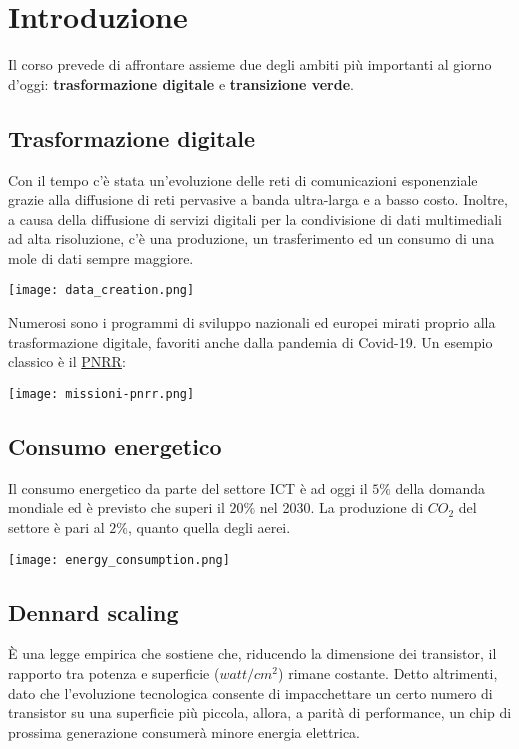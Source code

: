 \newpage
\section{Introduzione}
Il corso prevede di affrontare assieme due degli ambiti più importanti al giorno d'oggi: \textbf{trasformazione digitale} e \textbf{transizione verde}.
\subsection{Trasformazione digitale}
Con il tempo c'è stata un'evoluzione delle reti di comunicazioni esponenziale grazie alla diffusione di reti pervasive a banda ultra-larga e a basso costo. Inoltre, a causa della diffusione di servizi digitali per la condivisione di dati multimediali ad alta risoluzione, c'è una produzione, un trasferimento ed un consumo di una mole di dati sempre maggiore.
\begin{center}
	\texttt{[image: data\_creation.png]}
\end{center}
Numerosi sono i programmi di sviluppo nazionali ed europei mirati proprio alla trasformazione digitale, favoriti anche dalla pandemia di Covid-19. Un esempio classico è il \href{https://www.mimit.gov.it/it/pnrr/piano}{PNRR}:
\begin{center}
	\texttt{[image: missioni-pnrr.png]}
\end{center}

\newpage
\subsection{Consumo energetico}
Il consumo energetico da parte del settore ICT è ad oggi il $5\%$ della domanda mondiale ed è previsto che superi il $20\%$ nel 2030. La produzione di $CO_2$ del settore è pari al $2\%$, quanto quella degli aerei.
\begin{center}
	\texttt{[image: energy\_consumption.png]}
\end{center}

\subsection{Dennard scaling}
È una legge empirica che sostiene che, riducendo la dimensione dei transistor, il rapporto tra potenza e superficie ($watt/cm^2$) rimane costante. Detto altrimenti, dato che l’evoluzione tecnologica consente di impacchettare un certo numero di transistor su una superficie più piccola, allora, a parità di performance, un chip di prossima generazione consumerà minore energia elettrica.


